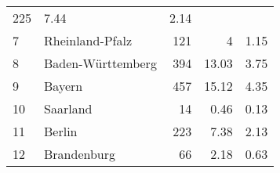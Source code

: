 \begin{longtable}{lXrrr}
       \num{225} &
       \num[round-mode=places,round-precision=2]{7.44} &
         \num[round-mode=places,round-precision=2]{2.14} \\

     7 &
     \multicolumn{1}{X}{ Rheinland-Pfalz   } &


       \num{121} &
       \num[round-mode=places,round-precision=2]{4} &
         \num[round-mode=places,round-precision=2]{1.15} \\

     8 &
     \multicolumn{1}{X}{ Baden-Württemberg   } &


       \num{394} &
       \num[round-mode=places,round-precision=2]{13.03} &
         \num[round-mode=places,round-precision=2]{3.75} \\

     9 &
     \multicolumn{1}{X}{ Bayern   } &


       \num{457} &
       \num[round-mode=places,round-precision=2]{15.12} &
         \num[round-mode=places,round-precision=2]{4.35} \\

     10 &
     \multicolumn{1}{X}{ Saarland   } &


       \num{14} &
       \num[round-mode=places,round-precision=2]{0.46} &
         \num[round-mode=places,round-precision=2]{0.13} \\

     11 &
     \multicolumn{1}{X}{ Berlin   } &


       \num{223} &
       \num[round-mode=places,round-precision=2]{7.38} &
         \num[round-mode=places,round-precision=2]{2.13} \\

     12 &
     \multicolumn{1}{X}{ Brandenburg   } &


       \num{66} &
       \num[round-mode=places,round-precision=2]{2.18} &
         \num[round-mode=places,round-precision=2]{0.63} \\


\end{longtable}
